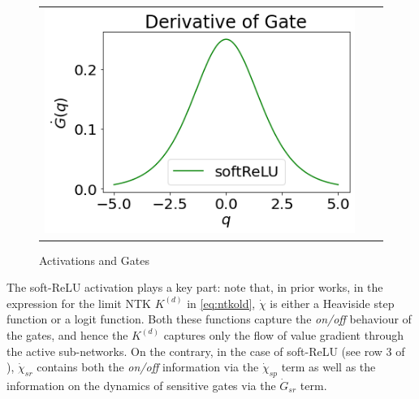 \begin{figure}[h]
{\begin{tabular}{ccc}
\includegraphics[scale=0.4]{figs/der-gate.png}
\end{tabular}
}
\caption{Activations and Gates}
\label{fig:actgate}
\end{figure}
\begin{table}[h]
\centering
{}
\caption{A comparison of prior work and our paper. Here $`sp'$ stands softplus.}
\label{tb:compare}
\end{table}
The soft-ReLU activation plays a key part: note that, in prior works, in the expression for the limit NTK $K^{(d)}$ in \eqref{eq:ntkold}, $\dot{\chi}$ is either a Heaviside step function or a logit function. Both these functions capture the \emph{on/off} behaviour of the gates, and hence the $K^{(d)}$ captures only the flow of value gradient through the active sub-networks. On the contrary, in the case of soft-ReLU (see row $3$ of ), $\dot{\chi}_{sr}$ contains both the \emph{on/off} information via the $\dot{\chi}_{sp}$ term as well as the information on the dynamics of sensitive gates via the $\dot{G}_{sr}$ term.

